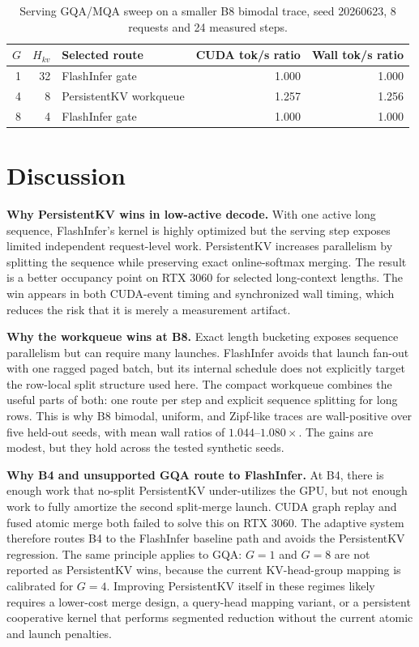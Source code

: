 \documentclass[10pt]{article}
\begin{document}
\begin{table}[t]
\centering
\caption{Serving GQA/MQA sweep on a smaller B8 bimodal trace, seed 20260623,
8 requests and 24 measured steps.}
\label{tab:gqa}
\small
\begin{tabular}{rrlrr}
\toprule
$G$ & $H_{kv}$ & Selected route & CUDA tok/s ratio & Wall tok/s ratio \\
\midrule
1 & 32 & FlashInfer gate & 1.000 & 1.000 \\
4 & 8 & PersistentKV workqueue & 1.257 & 1.256 \\
8 & 4 & FlashInfer gate & 1.000 & 1.000 \\
\bottomrule
\end{tabular}
\end{table}

\section{Discussion}

\textbf{Why PersistentKV wins in low-active decode.} With one active long
sequence, FlashInfer's kernel is highly optimized but the serving step exposes
limited independent request-level work. PersistentKV increases parallelism by
splitting the sequence while preserving exact online-softmax merging. The
result is a better occupancy point on RTX 3060 for selected long-context
lengths. The win appears in both CUDA-event timing and synchronized wall timing,
which reduces the risk that it is merely a measurement artifact.

\textbf{Why the workqueue wins at B8.} Exact length bucketing exposes sequence
parallelism but can require many launches. FlashInfer avoids that launch fan-out
with one ragged paged batch, but its internal schedule does not explicitly
target the row-local split structure used here. The compact workqueue combines
the useful parts of both: one route per step and explicit sequence splitting
for long rows. This is why B8 bimodal, uniform, and Zipf-like traces are
wall-positive over five held-out seeds, with mean wall ratios of
$1.044$--$1.080\times$. The gains are modest, but they hold across the tested
synthetic seeds.

\textbf{Why B4 and unsupported GQA route to FlashInfer.} At B4, there is enough work that no-split
PersistentKV under-utilizes the GPU, but not enough work to fully amortize the
second split-merge launch. CUDA graph replay and fused atomic merge both failed
to solve this on RTX 3060. The adaptive system therefore routes B4 to the
FlashInfer baseline path and avoids the PersistentKV regression. The same
principle applies to GQA: $G=1$ and $G=8$ are not reported as PersistentKV
wins, because the current KV-head-group mapping is calibrated for $G=4$.
Improving PersistentKV itself in these regimes likely requires a lower-cost
merge design, a query-head mapping variant, or a persistent cooperative kernel
that performs segmented reduction without the current atomic and launch
penalties.
\end{document}
